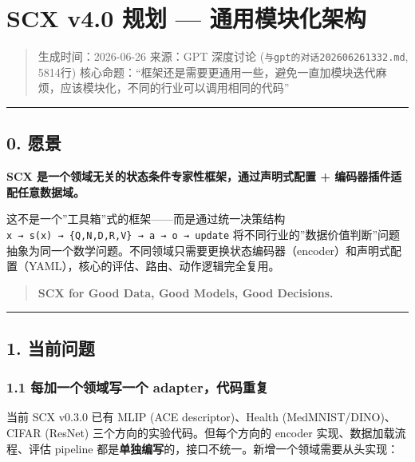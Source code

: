 \documentclass[
  12pt,
]{ctexart}
\author{SCX}
\date{2026}
\begin{document}
\section{SCX v4.0 规划 ---
通用模块化架构}\label{scx-v4.0-ux89c4ux5212-ux901aux7528ux6a21ux5757ux5316ux67b6ux6784}

\begin{quote}
生成时间：2026-06-26 来源：GPT 深度讨论
(\texttt{与gpt的对话202606261332.md}, 5814行)
核心命题：``框架还是需要更通用一些，避免一直加模块迭代麻烦，应该模块化，不同的行业可以调用相同的代码''
\end{quote}

\begin{center}\rule{0.5\linewidth}{0.5pt}\end{center}

\subsection{0. 愿景}\label{ux613fux666f}

\textbf{SCX 是一个领域无关的状态条件专家性框架，通过声明式配置 +
编码器插件适配任意数据域。}

这不是一个''工具箱''式的框架------而是通过统一决策结构
\texttt{x\ →\ s(x)\ →\ \{Q,N,D,R,V\}\ →\ a\ →\ o\ →\ update}
将不同行业的''数据价值判断''问题抽象为同一个数学问题。不同领域只需要更换状态编码器（encoder）和声明式配置（YAML），核心的评估、路由、动作逻辑完全复用。

\begin{quote}
\textbf{SCX for Good Data, Good Models, Good Decisions.}
\end{quote}

\begin{center}\rule{0.5\linewidth}{0.5pt}\end{center}

\subsection{1. 当前问题}\label{ux5f53ux524dux95eeux9898}

\subsubsection{1.1 每加一个领域写一个
adapter，代码重复}\label{ux6bcfux52a0ux4e00ux4e2aux9886ux57dfux5199ux4e00ux4e2a-adapterux4ee3ux7801ux91cdux590d}

当前 SCX v0.3.0 已有 MLIP (ACE descriptor)、Health
(MedMNIST/DINO)、CIFAR (ResNet) 三个方向的实验代码。但每个方向的 encoder
实现、数据加载流程、评估 pipeline
都是\textbf{单独编写}的，接口不统一。新增一个领域需要从头实现：
\end{document}
